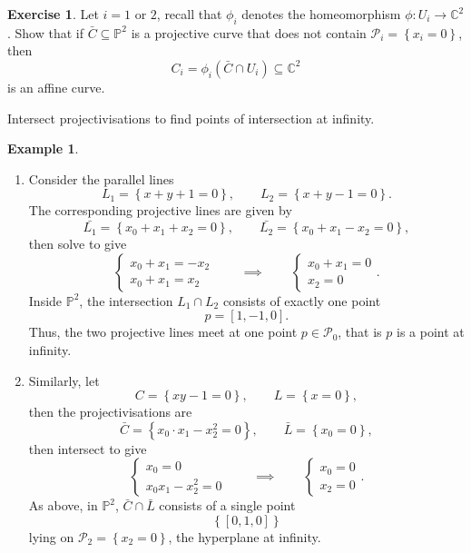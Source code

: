 \documentclass{article}
\newcommand{\C}{\mathbb{C}}
\renewcommand{\P}{\mathbb{P}}
\newcommand{\rb}[1]{\left( #1 \right)}
\renewcommand{\sb}[1]{\left[ #1 \right]}
\newcommand{\cb}[1]{\left\{ #1 \right\}}
\theoremstyle{definition}\newtheorem{definition}{Definition}[section]
\theoremstyle{definition}\newtheorem{notation}[definition]{Notation}
\theoremstyle{definition}\newtheorem{remark}[definition]{Remark}
\theoremstyle{definition}\newtheorem{example}[definition]{Example}
\theoremstyle{definition}\newtheorem{fact}{Fact}
\theoremstyle{definition}\newtheorem{exercise}{Exercise}
\begin{document}
\begin{exercise}
Let $ i = 1 $ or $ 2 $, recall that $ \phi_i $ denotes the homeomorphism $ \phi : U_i \to \C^2 $. Show that if $ \bar{C} \subseteq \P^2 $ is a projective curve that does not contain $ \mathcal{P}_i = \cb{x_i = 0} $, then
$$ C_i = \phi_i\rb{\bar{C} \cap U_i} \subseteq \C^2 $$
is an affine curve.
\end{exercise}


Intersect projectivisations to find points of intersection at infinity.

\begin{example}
\hfill
\begin{enumerate}
\item Consider the parallel lines
$$ L_1 = \cb{x + y + 1 = 0}, \qquad L_2 = \cb{x + y - 1 = 0}. $$
The corresponding projective lines are given by
$$ \bar{L_1} = \cb{x_0 + x_1 + x_2 = 0}, \qquad \bar{L_2} = \cb{x_0 + x_1 - x_2 = 0}, $$
then solve to give
$$ \begin{cases} x_0 + x_1 = -x_2 \\ x_0 + x_1 = x_2 \end{cases} \qquad \implies \qquad \begin{cases} x_0 + x_1 = 0 \\ x_2 = 0 \end{cases}. $$
Inside $ \P^2 $, the intersection $ L_1 \cap L_2 $ consists of exactly one point
$$ p = \sb{1, -1, 0}. $$
Thus, the two projective lines meet at one point $ p \in \mathcal{P}_0 $, that is $ p $ is a point at infinity.
\item Similarly, let
$$ C = \cb{xy - 1 = 0}, \qquad L = \cb{x = 0}, $$
then the projectivisations are
$$ \bar{C} = \cb{x_0 \cdot x_1 - x_2^2 = 0}, \qquad \bar{L} = \cb{x_0 = 0}, $$
then intersect to give
$$ \begin{cases} x_0 = 0 \\ x_0x_1 - x_2^2 = 0 \end{cases} \qquad \implies \qquad \begin{cases} x_0 = 0 \\ x_2 = 0 \end{cases}. $$
As above, in $ \P^2 $, $ \bar{C} \cap \bar{L} $ consists of a single point
$$ \cb{\sb{0, 1, 0}} $$
lying on $ \mathcal{P}_2 = \cb{x_2 = 0} $, the hyperplane at infinity.
\end{enumerate}
\end{example}
\end{document}
